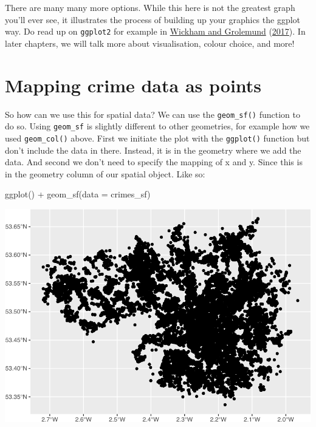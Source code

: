\documentclass[
  krantz2]{krantz}
\makeatletter
\newenvironment{Shaded}{\begin{snugshade}}{\end{snugshade}}
\newcommand{\AttributeTok}[1]{\textcolor[rgb]{0.61,0.61,0.61}{#1}}
\newcommand{\FunctionTok}[1]{\textcolor[rgb]{0,0,0}{#1}}
\newcommand{\NormalTok}[1]{#1}
\newcommand{\SpecialCharTok}[1]{\textcolor[rgb]{0,0,0}{#1}}
\newenvironment{kframe}{%
\medskip{}
\setlength{\fboxsep}{.8em}
 \def\at@end@of@kframe{}%
 \ifinner\ifhmode%
  \def\at@end@of@kframe{\end{minipage}}%
  \begin{minipage}{\columnwidth}%
 \fi\fi%
 \def\FrameCommand##1{\hskip\@totalleftmargin \hskip-\fboxsep
 \colorbox{shadecolor}{##1}\hskip-\fboxsep
     \hskip-\linewidth \hskip-\@totalleftmargin \hskip\columnwidth}%
 \MakeFramed {\advance\hsize-\width
   \@totalleftmargin\z@ \linewidth\hsize
   \@setminipage}}%
 {\par\unskip\endMakeFramed%
 \at@end@of@kframe}
\renewenvironment{Shaded}{\begin{kframe}}{\end{kframe}}
\makeatother
\begin{document}
There are many many more options. While this here is not the greatest graph you'll ever see, it illustrates the process of building up your graphics the ggplot way. Do read up on \texttt{ggplot2} for example in \protect\hyperlink{ref-Wickham_2017}{Wickham and Grolemund} (\protect\hyperlink{ref-Wickham_2017}{2017}). In later chapters, we will talk more about visualisation, colour choice, and more!

\hypertarget{mapping-crime-data-as-points}{%
\section{Mapping crime data as points}\label{mapping-crime-data-as-points}}

So how can we use this for spatial data? We can use the \texttt{geom\_sf()} function to do so. Using \texttt{geom\_sf} is slightly different to other geometries, for example how we used \texttt{geom\_col()} above. First we initiate the plot with the \texttt{ggplot()} function but don't include the data in there. Instead, it is in the geometry where we add the data. And second we don't need to specify the mapping of x and y. Since this is in the geometry column of our spatial object. Like so:

\begin{Shaded}
\begin{Highlighting}[]
\FunctionTok{ggplot}\NormalTok{() }\SpecialCharTok{+} 
  \FunctionTok{geom\_sf}\NormalTok{(}\AttributeTok{data =}\NormalTok{ crimes\_sf)}
\end{Highlighting}
\end{Shaded}

\includegraphics{crime_mapping_files/figure-latex/unnamed-chunk-14-1.pdf}
\end{document}
